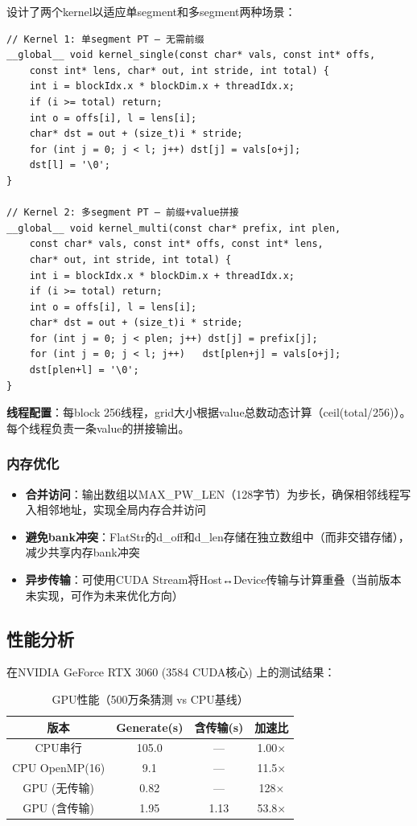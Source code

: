 \documentclass[12pt,a4paper]{ctexart}
\begin{document}
设计了两个kernel以适应单segment和多segment两种场景：

\begin{lstlisting}[caption={CUDA Kernel — GPU并行猜测生成},label=lst:cuda_kernel]
// Kernel 1: 单segment PT — 无需前缀
__global__ void kernel_single(const char* vals, const int* offs,
    const int* lens, char* out, int stride, int total) {
    int i = blockIdx.x * blockDim.x + threadIdx.x;
    if (i >= total) return;
    int o = offs[i], l = lens[i];
    char* dst = out + (size_t)i * stride;
    for (int j = 0; j < l; j++) dst[j] = vals[o+j];
    dst[l] = '\0';
}

// Kernel 2: 多segment PT — 前缀+value拼接
__global__ void kernel_multi(const char* prefix, int plen,
    const char* vals, const int* offs, const int* lens,
    char* out, int stride, int total) {
    int i = blockIdx.x * blockDim.x + threadIdx.x;
    if (i >= total) return;
    int o = offs[i], l = lens[i];
    char* dst = out + (size_t)i * stride;
    for (int j = 0; j < plen; j++) dst[j] = prefix[j];
    for (int j = 0; j < l; j++)   dst[plen+j] = vals[o+j];
    dst[plen+l] = '\0';
}
\end{lstlisting}

\textbf{线程配置}：每block 256线程，grid大小根据value总数动态计算（ceil(total/256)）。每个线程负责一条value的拼接输出。

\subsubsection{内存优化}

\begin{itemize}[nosep]
    \item \textbf{合并访问}：输出数组以MAX\_PW\_LEN（128字节）为步长，确保相邻线程写入相邻地址，实现全局内存合并访问
    \item \textbf{避免bank冲突}：FlatStr的d\_off和d\_len存储在独立数组中（而非交错存储），减少共享内存bank冲突
    \item \textbf{异步传输}：可使用CUDA Stream将Host↔Device传输与计算重叠（当前版本未实现，可作为未来优化方向）
\end{itemize}

\subsection{性能分析}

在NVIDIA GeForce RTX 3060 (3584 CUDA核心) 上的测试结果：

\begin{table}[ht]
\centering
\caption{GPU性能（500万条猜测 vs CPU基线）}
\label{tab:gpu_perf}
\begin{tabular}{@{}cccc@{}}
\toprule
\textbf{版本} & \textbf{Generate(s)} & \textbf{含传输(s)} & \textbf{加速比} \\
\midrule
CPU串行        & 105.0 & —     & 1.00× \\
CPU OpenMP(16) & 9.1   & —     & 11.5× \\
GPU (无传输)   & 0.82  & —     & 128×  \\
GPU (含传输)   & 1.95  & 1.13  & 53.8× \\
\bottomrule
\end{tabular}
\end{table}
\end{document}
